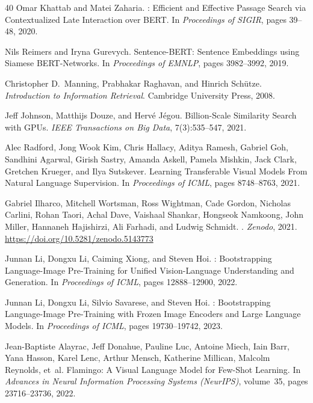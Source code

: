 \documentclass[11pt]{article}
\begin{document}
\begin{thebibliography}{40}
Omar Khattab and Matei Zaharia.
: Efficient and Effective Passage Search via Contextualized
Late Interaction over {BERT}.
\newblock In \emph{Proceedings of SIGIR}, pages 39--48, 2020.

Nils Reimers and Iryna Gurevych.
\newblock Sentence-{BERT}: Sentence Embeddings using Siamese {BERT}-Networks.
\newblock In \emph{Proceedings of EMNLP}, pages 3982--3992, 2019.

Christopher D.\ Manning, Prabhakar Raghavan, and Hinrich Sch\"{u}tze.
\newblock \emph{Introduction to Information Retrieval}.
\newblock Cambridge University Press, 2008.


Jeff Johnson, Matthijs Douze, and Herv\'{e} J\'{e}gou.
\newblock Billion-Scale Similarity Search with {GPU}s.
\newblock \emph{IEEE Transactions on Big Data}, 7(3):535--547, 2021.


Alec Radford, Jong Wook Kim, Chris Hallacy, Aditya Ramesh, Gabriel Goh,
Sandhini Agarwal, Girish Sastry, Amanda Askell, Pamela Mishkin, Jack Clark,
Gretchen Krueger, and Ilya Sutskever.
\newblock Learning Transferable Visual Models From Natural Language Supervision.
\newblock In \emph{Proceedings of ICML}, pages 8748--8763, 2021.

Gabriel Ilharco, Mitchell Wortsman, Ross Wightman, Cade Gordon, Nicholas
Carlini, Rohan Taori, Achal Dave, Vaishaal Shankar, Hongseok Namkoong, John
Miller, Hannaneh Hajishirzi, Ali Farhadi, and Ludwig Schmidt.
.
\newblock \emph{Zenodo}, 2021. \url{https://doi.org/10.5281/zenodo.5143773}

Junnan Li, Dongxu Li, Caiming Xiong, and Steven Hoi.
: Bootstrapping Language-Image Pre-Training for Unified
Vision-Language Understanding and Generation.
\newblock In \emph{Proceedings of ICML}, pages 12888--12900, 2022.

Junnan Li, Dongxu Li, Silvio Savarese, and Steven Hoi.
: Bootstrapping Language-Image Pre-Training with Frozen
Image Encoders and Large Language Models.
\newblock In \emph{Proceedings of ICML}, pages 19730--19742, 2023.

Jean-Baptiste Alayrac, Jeff Donahue, Pauline Luc, Antoine Miech, Iain Barr,
Yana Hasson, Karel Lenc, Arthur Mensch, Katherine Millican, Malcolm Reynolds,
et~al.
\newblock Flamingo: A Visual Language Model for Few-Shot Learning.
\newblock In \emph{Advances in Neural Information Processing Systems
(NeurIPS)}, volume~35, pages 23716--23736, 2022.


\end{thebibliography}
\end{document}
